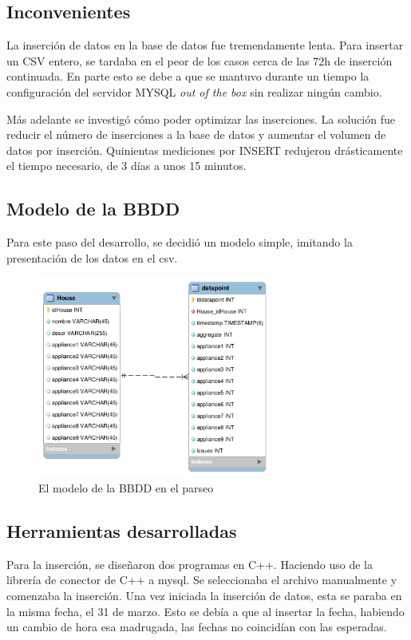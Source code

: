 \subsection{Inconvenientes}
La inserción de datos en la base de datos fue tremendamente lenta. Para insertar un CSV entero, se tardaba en el peor de los casos cerca de las 72h de inserción continuada.
En parte esto se debe a que se mantuvo durante un tiempo la configuración del servidor MYSQL \textit{out of the box} sin realizar ningún cambio.

Más adelante se investigó cómo poder optimizar las inserciones. La solución fue reducir el número de inserciones a la base de datos y aumentar el volumen de datos por inserción. Quinientas mediciones por INSERT redujeron drásticamente el tiempo necesario, de 3 días a unos 15 minutos.

\subsection{Modelo de la BBDD}
Para este paso del desarrollo, se decidió un modelo simple, imitando la presentación de los datos en el csv.
\begin{figure}[H]
    \centering
    \includegraphics[height=250px]{images/db_parsingstep.png}
    \caption{El modelo de la BBDD en el parseo}
    \label{diagramaBBDD}
\end{figure}

\subsection{Herramientas desarrolladas}
Para la inserción, se diseñaron dos programas en C++. Haciendo uso de la librería de conector de C++ a mysql. Se seleccionaba el archivo manualmente y comenzaba la inserción. 
Una vez iniciada la inserción de datos, esta se paraba en la misma fecha, el 31 de marzo. Esto se debía a que al insertar la fecha, habiendo un cambio de hora esa madrugada, las fechas no coincidían con las esperadas.

